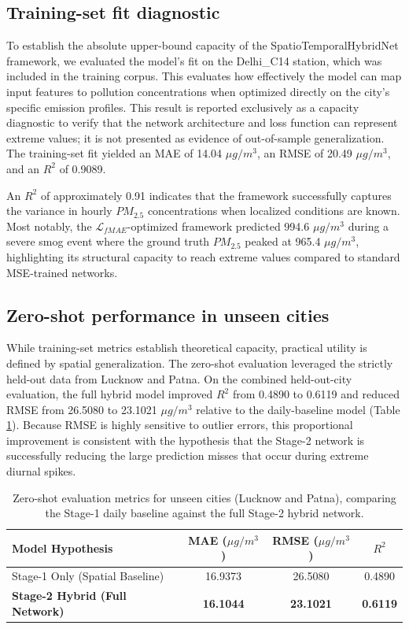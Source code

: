 \subsection{Training-set fit diagnostic}
To establish the absolute upper-bound capacity of the SpatioTemporalHybridNet framework, we evaluated the model's fit on the Delhi\_C14 station, which was included in the training corpus. This evaluates how effectively the model can map input features to pollution concentrations when optimized directly on the city's specific emission profiles. This result is reported exclusively as a capacity diagnostic to verify that the network architecture and loss function can represent extreme values; it is not presented as evidence of out-of-sample generalization. The training-set fit yielded an MAE of 14.04 $\mu g/m^3$, an RMSE of 20.49 $\mu g/m^3$, and an $R^2$ of 0.9089. 

An $R^2$ of approximately 0.91 indicates that the framework successfully captures the variance in hourly $PM_{2.5}$ concentrations when localized conditions are known. Most notably, the $\mathcal{L}_{fMAE}$-optimized framework predicted 994.6 $\mu g/m^3$ during a severe smog event where the ground truth $PM_{2.5}$ peaked at 965.4 $\mu g/m^3$, highlighting its structural capacity to reach extreme values compared to standard MSE-trained networks.

\subsection{Zero-shot performance in unseen cities}
While training-set metrics establish theoretical capacity, practical utility is defined by spatial generalization. The zero-shot evaluation leveraged the strictly held-out data from Lucknow and Patna. On the combined held-out-city evaluation, the full hybrid model improved $R^2$ from 0.4890 to 0.6119 and reduced RMSE from 26.5080 to 23.1021 $\mu g/m^3$ relative to the daily-baseline model (Table \ref{tab:zeroshot}). Because RMSE is highly sensitive to outlier errors, this proportional improvement is consistent with the hypothesis that the Stage-2 network is successfully reducing the large prediction misses that occur during extreme diurnal spikes.

\begin{table}[h]
\centering
\caption{Zero-shot evaluation metrics for unseen cities (Lucknow and Patna), comparing the Stage-1 daily baseline against the full Stage-2 hybrid network.}
\label{tab:zeroshot}
\begin{tabular}{lccc}
\toprule
\textbf{Model Hypothesis} & \textbf{MAE ($\mu g/m^3$)} & \textbf{RMSE ($\mu g/m^3$)} & \textbf{$R^2$} \\
\midrule
Stage-1 Only (Spatial Baseline) & 16.9373 & 26.5080 & 0.4890 \\
\textbf{Stage-2 Hybrid (Full Network)} & \textbf{16.1044} & \textbf{23.1021} & \textbf{0.6119} \\
\bottomrule
\end{tabular}
\end{table}

